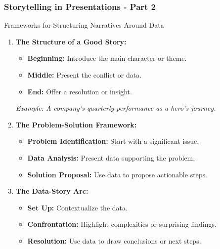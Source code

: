\documentclass[aspectratio=169]{beamer}
\begin{document}
\begin{frame}[fragile]
    \frametitle{Storytelling in Presentations - Part 2}
    
    \begin{block}{Frameworks for Structuring Narratives Around Data}
        \begin{enumerate}
            \item \textbf{The Structure of a Good Story:}
                \begin{itemize}
                    \item \textbf{Beginning:} Introduce the main character or theme.
                    \item \textbf{Middle:} Present the conflict or data.
                    \item \textbf{End:} Offer a resolution or insight.
                \end{itemize}
                \textit{Example: A company’s quarterly performance as a hero's journey.}
                
            \item \textbf{The Problem-Solution Framework:}
                \begin{itemize}
                    \item \textbf{Problem Identification:} Start with a significant issue.
                    \item \textbf{Data Analysis:} Present data supporting the problem.
                    \item \textbf{Solution Proposal:} Use data to propose actionable steps.
                \end{itemize}
            
            \item \textbf{The Data-Story Arc:}
                \begin{itemize}
                    \item \textbf{Set Up:} Contextualize the data.
                    \item \textbf{Confrontation:} Highlight complexities or surprising findings.
                    \item \textbf{Resolution:} Use data to draw conclusions or next steps.
                \end{itemize}
        \end{enumerate}
    \end{block}
\end{frame}
\end{document}
